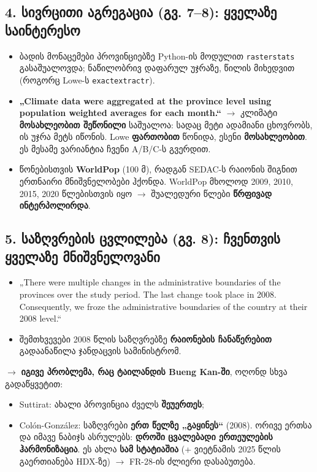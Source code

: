 \documentclass[11pt,a4paper]{article}
\begin{document}
\subsection*{4. სივრცითი აგრეგაცია (გვ. 7–8): ყველაზე საინტერესო}
\begin{itemize}[nosep]
\item ბადის მონაცემები პროვინციებზე Python-ის მოდულით \texttt{rasterstats} გასაშუალოვდა; ნაწილობრივ დაფარულ უჯრაზე, წილის მიხედვით (როგორც Lowe-ს \texttt{exactextractr}).
\item \textbf{„Climate data were aggregated at the province level using population weighted averages for each month.“}
$\rightarrow$ კლიმატი \textbf{მოსახლეობით შეწონილი} საშუალოა: სადაც მეტი ადამიანი ცხოვრობს, ის უჯრა მეტს იწონის.
Lowe \textbf{ფართობით} წონიდა, ესენი \textbf{მოსახლეობით}. ეს მესამე ვარიანტია ჩვენი A/B/C-ს გვერდით.
\item წონებისთვის \textbf{WorldPop} (100 მ), რადგან SEDAC-ს რაიონის შიგნით ერთნაირი მნიშვნელობები ჰქონდა. WorldPop
მხოლოდ 2009, 2010, 2015, 2020 წლებისთვის იყო $\rightarrow$ შუალედური წლები \textbf{წრფივად ინტერპოლირდა}.
\end{itemize}

\subsection*{5. საზღვრების ცვლილება (გვ. 8): ჩვენთვის ყველაზე მნიშვნელოვანი}
\begin{itemize}[nosep]
\item „There were multiple changes in the administrative boundaries of the provinces over the study period. The last
change took place in 2008. Consequently, we froze the administrative boundaries of the country at their 2008 level.“
\item შემთხვევები 2008 წლის საზღვრებზე \textbf{რაიონების ჩანაწერებით} გადაანაწილა ჯანდაცვის სამინისტრომ.
\end{itemize}
$\rightarrow$ \textbf{იგივე პრობლემა, რაც ტაილანდის Bueng Kan-ში}, ოღონდ სხვა გადაწყვეტით:
\begin{itemize}[nosep]
\item Suttirat: ახალი პროვინცია ძველს \textbf{შეუერთეს};
\item Colón-González: საზღვრები \textbf{ერთ წელზე „გაყინეს“} (2008).
ორივე ერთსა და იმავე ნაბიჯს ასრულებს: \textbf{დროში ცვალებადი ერთეულების ჰარმონიზაცია}. ეს ახლა \textbf{სამ სტატიაშია}
(+ ვიეტნამის 2025 წლის გაერთიანება HDX-ზე) $\rightarrow$ FR-28-ის ძლიერი დასაბუთება.
\end{itemize}
\end{document}
